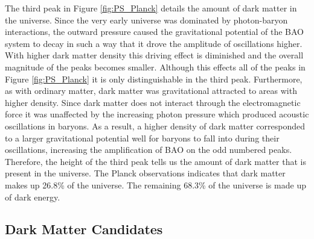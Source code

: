 \documentclass[a4paper,12pt]{article}
\begin{document}
The third peak in Figure \ref{fig:PS_Planck} details the amount of dark matter in the universe.  Since the very early universe was dominated by photon-baryon interactions, the outward pressure caused the gravitational potential of the BAO system to decay in such a way that it drove the amplitude of oscillations higher.  With higher dark matter density this driving effect is diminished and the overall magnitude of the peaks becomes smaller.  Although this effects all of the peaks in Figure \ref{fig:PS_Planck} it is only distinguishable in the third peak.  Furthermore, as with ordinary matter, dark matter was gravitational attracted to areas with higher density.  Since dark matter does not interact through the electromagnetic force it was unaffected by the increasing photon pressure which produced acoustic oscillations in baryons.  As a result, a higher density of dark matter corresponded to a larger gravitational potential well for baryons to fall into during their oscillations, increasing the amplification of BAO on the odd numbered peaks.  Therefore, the height of the third peak tells us the amount of dark matter that is present in the universe. \cite{Whu} The Planck observations indicates that dark matter makes up 26.8\% of the universe.  The remaining 68.3\% of the universe is made up of dark energy. \cite{Planck}


\subsection{Dark Matter Candidates}
\end{document}
